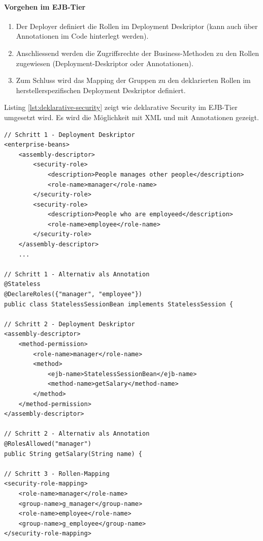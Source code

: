 \paragraph{Vorgehen im EJB-Tier}
\begin{enumerate}
	\item Der Deployer definiert die Rollen im Deployment Deskriptor (kann auch über Annotationen im Code hinterlegt werden).
	
	\item Anschliessend werden die Zugriffsrechte der Business-Methoden zu den Rollen zugewiesen (Deployment-Deskriptor oder Annotationen).
	
	\item Zum Schluss wird das Mapping der Gruppen zu den deklarierten Rollen im herstellerspezifischen Deployment Deskriptor definiert.
\end{enumerate}

\newpage

Listing \ref{lst:deklarative-security} zeigt wie deklarative Security im EJB-Tier umgesetzt wird. Es wird die Möglichkeit mit XML und mit Annotationen gezeigt.

\begin{lstlisting}[caption=Deklarative Security im EJB-Tier, label=lst:deklarative-security]
// Schritt 1 - Deployment Deskriptor
<enterprise-beans>
	<assembly-descriptor>
		<security-role>
			<description>People manages other people</description>
			<role-name>manager</role-name>
		</security-role>
		<security-role>
			<description>People who are employeed</description>
			<role-name>employee</role-name>
		</security-role>
	</assembly-descriptor>
	...

// Schritt 1 - Alternativ als Annotation
@Stateless
@DeclareRoles({"manager", "employee"})
public class StatelessSessionBean implements StatelessSession {

// Schritt 2 - Deployment Deskriptor
<assembly-descriptor>
	<method-permission>
		<role-name>manager</role-name>
		<method>
			<ejb-name>StatelessSessionBean</ejb-name>
			<method-name>getSalary</method-name>
		</method>
	</method-permission>
</assembly-descriptor>

// Schritt 2 - Alternativ als Annotation
@RolesAllowed("manager")
public String getSalary(String name) {

// Schritt 3 - Rollen-Mapping
<security-role-mapping>
	<role-name>manager</role-name>
	<group-name>g_manager</group-name>
	<role-name>employee</role-name>
	<group-name>g_employee</group-name>
</security-role-mapping>
\end{lstlisting}

